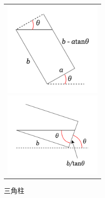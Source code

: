\documentclass{article}
\begin{document}
\begin{figure}[h]
    \begin{center}
        \begin{tabular}{c}
            \begin{minipage}{0.45\hsize}
                \begin{center}
                    \includegraphics[width=140pt]{fig1.png}
                    \caption{四角柱}
                    \label{fig1}
                \end{center}
            \end{minipage}

            \begin{minipage}{0.45\hsize}
                \begin{center}
                    \includegraphics[width=140pt]{fig2.png}
                    \caption{三角柱}
                    \label{fig2}
                \end{center}
            \end{minipage}
        \end{tabular}
    \end{center}
\end{figure}
\end{document}

